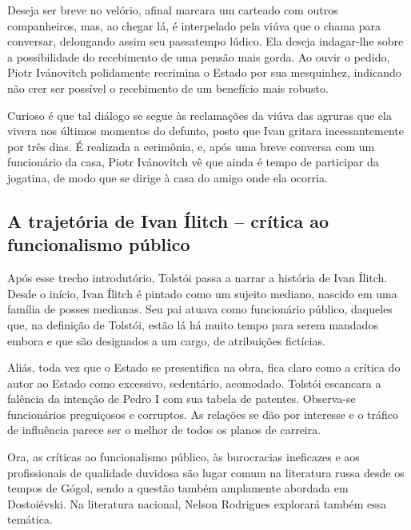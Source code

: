 \documentclass[12pt]{extarticle}
\begin{document}
Deseja ser breve no velório, afinal marcara um carteado com outros
companheiros, mas, ao chegar lá, é interpelado pela viúva que o chama
para conversar, delongando assim seu passatempo lúdico. Ela deseja
indagar-lhe sobre a possibilidade do recebimento de uma pensão mais
gorda. Ao ouvir o pedido, Piotr Ivánovitch polidamente recrimina o
Estado por sua mesquinhez, indicando não crer ser possível o recebimento
de um benefício mais robusto.

Curioso é que tal diálogo se segue às reclamações da viúva das agruras
que ela vivera nos últimos momentos do defunto, posto que Ivan gritara incessantemente por três dias. É realizada a cerimônia, e, após uma breve conversa com um funcionário
da casa, Piotr Ivánovitch vê que ainda é tempo de participar da
jogatina, de modo que se dirige à casa do amigo onde ela ocorria.

\subsection{A trajetória de Ivan Ílitch -- crítica ao funcionalismo público}

Após esse trecho introdutório, Tolstói passa a narrar a história de
Ivan Ílitch. Desde o início, Ivan Ílitch é pintado como um sujeito
mediano, nascido em uma família de posses medianas. Seu pai atuava como
funcionário público, daqueles que, na definição de Tolstói, estão lá há
muito tempo para serem mandados embora e que são designados a um cargo, de atribuições fictícias.

Aliás, toda vez que o Estado se presentifica na obra, fica claro como a crítica do autor ao Estado como excessivo, sedentário, acomodado. Tolstói escancara a
falência da intenção de Pedro I com sua tabela de patentes. Observa-se
funcionários preguiçosos e corruptos. As relações se dão
por interesse e o tráfico de influência parece ser o melhor de todos os
planos de carreira.






Ora, as críticas ao funcionalismo público, às burocracias ineficazes e
aos profissionais de qualidade duvidosa são lugar comum na literatura
russa desde os tempos de Gógol, sendo a questão também amplamente
abordada em Dostoiévski. Na literatura nacional, Nelson Rodrigues
explorará também essa temática.
\end{document}
